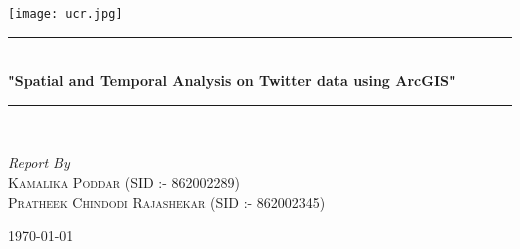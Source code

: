 \documentclass[12pt, oneside]{article}   	%
\begin{document}
\begin{titlepage}
	\begin{center}
	\vspace*{0.1cm}
	\texttt{[image: ucr.jpg]}
	\newcommand{\HRule}{\rule{\linewidth}{0.5mm}} 
	\centering
	\HRule \\[0.5cm]
	{ \Huge \bfseries "Spatial and Temporal Analysis on Twitter data using ArcGIS"}\\[0.4cm] %
	\HRule \\[1.5cm]
	
		\vspace{3cm}
	
		\emph{Report By}\\
		\vspace{1cm}
		\textsc{\LARGE Kamalika Poddar (SID :- 862002289) }\\ 
		\vspace{0.2cm}		
		\vspace{0.2cm}
		\textsc{\LARGE	Pratheek Chindodi Rajashekar (SID :- 862002345)} \\
			\bigskip
		
	
		\vspace*{4cm}
		\Large \today
	\end{center}	
	\vspace{1cm}
	\vfill 
\end{titlepage}

\setcounter{page}{1}
\pagestyle{fancy}

\newpage
\vspace{2cm}
\end{document}
